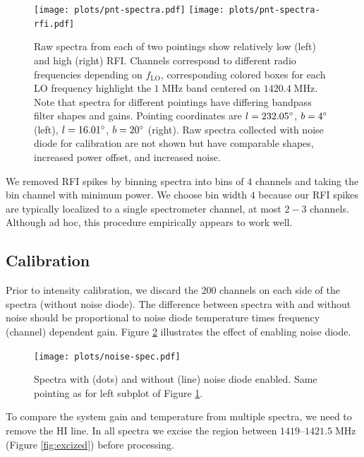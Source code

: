 \documentclass[10pt]{article}
\newcommand {\mt}{\mathrm}
\newcommand {\unit}[1]{\; \mt{#1}}
\begin{document}
\begin{figure}[!ht]
    \centering
    \texttt{[image: plots/pnt-spectra.pdf]}
    \texttt{[image: plots/pnt-spectra-rfi.pdf]} \\
    \caption{Raw spectra from each of two pointings show relatively low (left) and high (right) RFI.  Channels correspond to different radio frequencies depending on $f_{\mt{LO}}$, corresponding colored boxes for each LO frequency highlight the $1\unit{MHz}$ band centered on $1420.4 \unit{MHz}$.  Note that spectra for different pointings have differing bandpass filter shapes and gains.  Pointing coordinates are $l=232.05\degree$, $b=4\degree$ (left), $l=16.01\degree$, $b=20\degree$ (right).  Raw spectra collected with noise diode for calibration are not shown but have comparable shapes, increased power offset, and increased noise.}
    \label{fig:rfi}
\end{figure}

We removed RFI spikes by binning spectra into bins of $4$ channels and taking the bin channel with minimum power.  We choose bin width $4$ because our RFI spikes are typically localized to a single spectrometer channel, at most $2-3$ channels.  Although ad hoc, this procedure empirically appears to work well.

\subsection{Calibration}

Prior to intensity calibration, we discard the $200$ channels on each side of the spectra (without noise diode).  The difference between spectra with and without noise should be proportional to noise diode temperature times frequency (channel) dependent gain.  Figure \ref{fig:noise} illustrates the effect of enabling noise diode.

\begin{figure}[!ht]
    \centering
    \texttt{[image: plots/noise-spec.pdf]}\\
    \caption{Spectra with (dots) and without (line) noise diode enabled.  Same pointing as for left subplot of Figure \ref{fig:rfi}.}
    \label{fig:noise}
\end{figure}

To compare the system gain and temperature from multiple spectra, we need to remove the HI line.  In all spectra we excise the region between $1419$--$1421.5\unit{MHz}$ (Figure \ref{fig:excized}) before processing.
\end{document}
